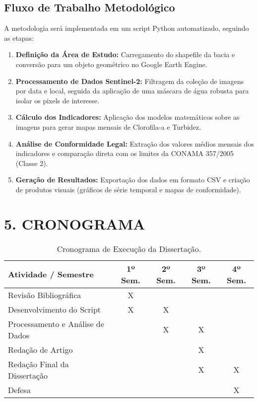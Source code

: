 \documentclass[12pt, a4paper]{article}
\begin{document}
    \subsection{Fluxo de Trabalho Metodológico}
    A metodologia será implementada em um script Python automatizado, seguindo as etapas:
    \begin{enumerate}
        \item \textbf{Definição da Área de Estudo:} Carregamento do shapefile da bacia e conversão para um objeto geométrico no Google Earth Engine.
        \item \textbf{Processamento de Dados Sentinel-2:} Filtragem da coleção de imagens por data e local, seguida da aplicação de uma máscara de água robusta para isolar os pixels de interesse.
        \item \textbf{Cálculo dos Indicadores:} Aplicação dos modelos matemáticos sobre as imagens para gerar mapas mensais de Clorofila-a e Turbidez.
        \item \textbf{Análise de Conformidade Legal:} Extração dos valores médios mensais dos indicadores e comparação direta com os limites da CONAMA 357/2005 (Classe 2).
        \item \textbf{Geração de Resultados:} Exportação dos dados em formato CSV e criação de produtos visuais (gráficos de série temporal e mapas de conformidade).
    \end{enumerate}

    \section*{5. CRONOGRAMA}
    \begin{table}[h!]
    \centering
    \caption{Cronograma de Execução da Dissertação.}
    \begin{tabular}{|l|c|c|c|c|}
    \hline
    \textbf{Atividade / Semestre} & \textbf{1º Sem.} & \textbf{2º Sem.} & \textbf{3º Sem.} & \textbf{4º Sem.} \\ \hline
    Revisão Bibliográfica & X & & & \\ \hline
    Desenvolvimento do Script & X & X & & \\ \hline
    Processamento e Análise de Dados & & X & X & \\ \hline
    Redação de Artigo & & & X & \\ \hline
    Redação Final da Dissertação & & & X & X \\ \hline
    Defesa & & & & X \\ \hline
    \end{tabular}
    \end{table}
\end{document}
